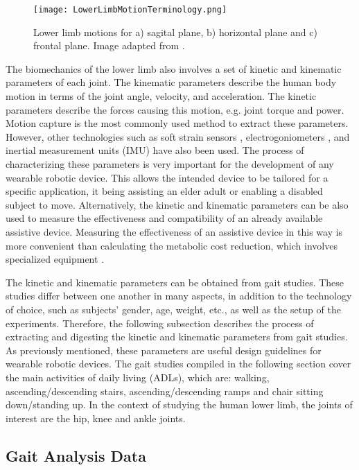 \begin{figure}[htbp!]
    \centering
    \texttt{[image: LowerLimbMotionTerminology.png]}
    \caption{Lower limb motions for a) sagital plane, b) horizontal plane and c) frontal plane. Image adapted from  \cite{PhysicalSolutions2016}. }
    \label{fig:lower_motion}
\end{figure}

\newpage

The biomechanics of the lower limb also involves a set of kinetic and kinematic parameters of each joint. The kinematic parameters describe the human body motion in terms of the joint angle, velocity, and acceleration. The kinetic
parameters describe the forces causing this motion, e.g. joint torque and power. Motion capture is the most commonly used method to extract these parameters. However, other technologies such as soft strain sensors \cite{mengucc2014wearable}, electrogoniometers \cite{wu2011electromyography}, and inertial measurement units (IMU) have also been used. The process of characterizing these parameters is very important for the development of any wearable robotic device. This allows the intended device to be tailored for a specific application, it being assisting an elder adult or enabling a disabled subject to move. Alternatively, the kinetic and kinematic parameters can be also used to measure the effectiveness and compatibility of an already available assistive device. Measuring the effectiveness of an assistive device in this way is more convenient than calculating the metabolic cost reduction, which involves specialized equipment \cite{panizzolo2016biologically}. 

The kinetic and kinematic parameters can be obtained from gait studies. These studies differ between one another in many aspects, in addition to the technology of choice, such as subjects' gender, age, weight, etc., as well as the setup of the experiments. Therefore, the following subsection describes the process of extracting and digesting the kinetic and kinematic parameters from gait studies. As previously mentioned, these parameters are useful design guidelines for wearable robotic devices. The gait studies compiled in the following section cover the main activities of daily living (ADLs), which are: walking, ascending/descending stairs, ascending/descending ramps and chair sitting down/standing up. In the context of studying the human lower limb, the joints of interest are the hip, knee and ankle joints.

\subsection{Gait Analysis Data}

